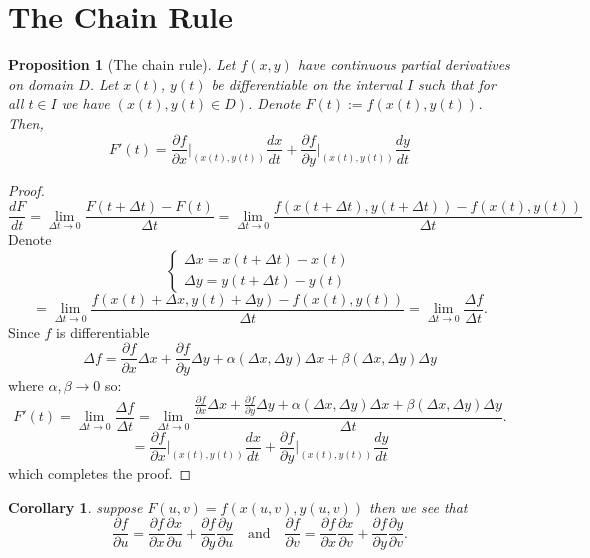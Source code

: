 \documentclass[11pt,a4paper]{article}
\theoremstyle{definition}
\theoremstyle{plain}
\newtheorem{proposition}[theorem]{Proposition}
\newtheorem{corollary}[theorem]{Corollary}
\newcommand{\tand}{\quad \text{and} \quad}
\begin{document}
  \section{The Chain Rule}
  \begin{proposition}[The chain rule]
    Let $f(x,y)$ have continuous partial derivatives on domain $D$.
    Let $x(t)$, $y(t)$ be differentiable on the interval $I$ such that
    for all $t \in I$ we have $(x(t),y(t) \in D)$.
    Denote $F(t) := f(x(t),y(t))$.
    Then,
    \[
      F'(t) = 
      \frac{\partial f}{\partial x}\biggr|_{(x(t),y(t))}\frac{dx}{dt} + 
      \frac{\partial f}{\partial y}\biggr|_{(x(t),y(t))}\frac{dy}{dt}
    \]
  \end{proposition}
  \begin{proof}
    \[
      \frac{dF}{dt} =
      \lim_{\Delta t\to 0}{\frac{F(t+\Delta t)-F(t)}{\Delta t}} =
      \lim_{\Delta t\to 0}
      {\frac{f(x(t+\Delta t),y(t+\Delta t))-f(x(t),y(t))}{\Delta t}} 
    \]
    Denote
    $$\begin{cases}
      \Delta x = x(t+\Delta t) - x(t) \\
      \Delta y = y(t+\Delta t) - y(t) 
    \end{cases}$$
    \[
      = \lim_{\Delta t\to 0}
      {\frac{f(x(t) + \Delta x,y(t)+\Delta y)-f(x(t),y(t))}{\Delta t}} 
      = \lim_{\Delta t\to 0}{\frac{\Delta f}{\Delta t}}.
    \]
    Since $f$ is differentiable
    \[
      \Delta f =
      \frac{\partial f}{\partial x}\Delta x + 
      \frac{\partial f}{\partial y}\Delta y + 
      \alpha(\Delta x,\Delta y)\Delta x + \beta(\Delta x,\Delta y)\Delta y
    \]
    where $\alpha,\beta\to 0 $ so:
    \[
      F'(t) =
      \lim_{\Delta t\to 0}{\frac{\Delta f}{\Delta t}} =
      \lim_{\Delta t\to 0}{\frac{\frac{\partial f}{\partial x}\Delta x + 
      \frac{\partial f}{\partial y}\Delta y +
      \alpha(\Delta x,\Delta y)\Delta x + 
      \beta(\Delta x,\Delta y)\Delta y}{\Delta t}}.
    \]
    \[
      = \frac{\partial f}{\partial x}\biggr|_{(x(t),y(t))}\frac{dx}{dt} + 
        \frac{\partial f}{\partial y}\biggr|_{(x(t),y(t))}\frac{dy}{dt}
    \]
    which completes the proof.
  \end{proof}

  \begin{corollary}
    suppose $F(u,v) = f(x(u,v),y(u,v))$ then we see that
    \[
      \frac{\partial f}{\partial u} =
      \frac{\partial f}{\partial x}
      \frac{\partial x}{\partial u} +
      \frac{\partial f}{\partial y}
      \frac{\partial y}{\partial u}
    \tand
      \frac{\partial f}{\partial v} =
      \frac{\partial f}{\partial x}
      \frac{\partial x}{\partial v} +
      \frac{\partial f}{\partial y}
      \frac{\partial y}{\partial v}.
    \]
  \end{corollary}
\end{document}
